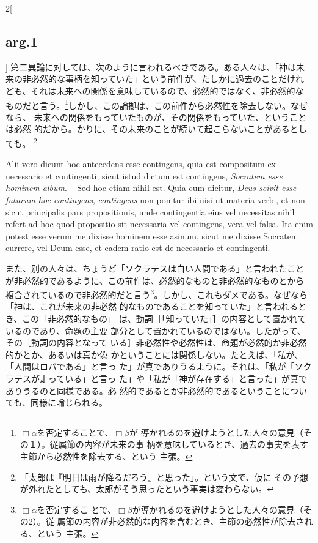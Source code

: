 \documentclass[paper=a4paper,fontsize=10pt,jafontsize=9pt,titlepage]{jlreq}
\begin{document}
\begin{paracol}{2}[\subsection{arg.1}]
第二異論に対しては、次のように言われるべきである。ある人々は、「神は未
来の非必然的な事柄を知っていた」という前件が、たしかに過去のことだけれ
ども、それは未来への関係を意味しているので、必然的ではなく、非必然的な
ものだと言う。\footnote{$\Box \alpha$を否定することで、$\Box \beta$が
導かれるのを避けようとした人々の意見（その１）。従属節の内容が未来の事
柄を意味しているとき、過去の事実を表す主節から必然性を除去する、という
主張。}しかし、この論拠は、この前件から必然性を除去しない。なぜなら、
未来への関係をもっていたものが、その関係をもっていた、ということは必然
的だから。かりに、その未来のことが続いて起こらないことがあるとしても。
\footnote{「太郎は『明日は雨が降るだろう』と思った」。という文で、仮に
その予想が外れたとしても、太郎がそう思ったという事実は変わらない。}

\switchcolumn*

Alii vero dicunt hoc antecedens esse contingens, quia est compositum
ex necessario et contingenti; sicut istud dictum est contingens,
{\itshape Socratem esse hominem album}. -- Sed hoc etiam nihil
est. Quia cum dicitur, {\itshape Deus scivit esse futurum hoc
contingens}, {\itshape contingens} non ponitur ibi nisi ut materia
verbi, et non sicut principalis pars propositionis, unde contingentia
eius vel necessitas nihil refert ad hoc quod propositio sit necessaria
vel contingens, vera vel falsa. Ita enim potest esse verum me dixisse
hominem esse asinum, sicut me dixisse Socratem currere, vel Deum esse,
et eadem ratio est de necessario et contingenti.

\switchcolumn

また、別の人々は、ちょうど「ソクラテスは白い人間である」と言われたこと
が非必然的であるように、この前件は、必然的なものと非必然的なものとから
複合されているので非必然的だと言う\footnote{$\Box \alpha$を否定するこ
とで、$\Box \beta$が導かれるのを避けようとした人々の意見（その2）。従
属節の内容が非必然的な内容を含むとき、主節の必然性が除去される、という
主張。}。しかし、これもダメである。なぜなら「神は、これが未来の非必然
的なものであることを知っていた」と言われるとき、この「非必然的なもの」
は、動詞［「知っていた」］の内容として置かれているのであり、命題の主要
部分として置かれているのではない。したがって、その［動詞の内容となって
いる］非必然性や必然性は、命題が必然的か非必然的かとか、あるいは真か偽
かということには関係しない。たとえば、「私が、「人間はロバである」と言っ
た」が真でありうるように。それは、「私が「ソクラテスが走っている」と言っ
た」や「私が「神が存在する」と言った」が真でありうるのと同様である。必
然的であるとか非必然的であるということについても、同様に論じられる。


\end{paracol}
\end{document}
